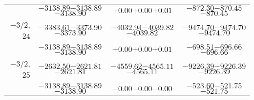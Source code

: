 \documentclass[compress]{beamer}
\begin{document}
\begin{frame}
{\begin{tabular}{r | c | c | c}
           & $-3138.89$\hspace{0.1 cm}$-3138.89$\hspace{0.1 cm}\textcolor{black}{$-3138.90$} & $+0.00$\hspace{0.1 cm}$+0.00$\hspace{0.1 cm}\textcolor{black}{$+0.01$} & $-872.30$\hspace{0.1 cm}$-870.45$\hspace{0.1 cm}\textcolor{black}{$-870.45$} \\
$-$3/2, 24 & $-3383.61$\hspace{0.1 cm}$-3373.90$\hspace{0.1 cm}\textcolor{black}{$-3373.90$} & $-4032.94$\hspace{0.1 cm}$-4039.82$\hspace{0.1 cm}\textcolor{black}{$-4039.82$} & $-9474.70$\hspace{0.1 cm}$-9474.70$\hspace{0.1 cm}\textcolor{black}{$-9474.70$} \\
           & $-3138.89$\hspace{0.1 cm}$-3138.89$\hspace{0.1 cm}\textcolor{black}{$-3138.90$} & $+0.00$\hspace{0.1 cm}$+0.00$\hspace{0.1 cm}\textcolor{black}{$+0.01$} & $-698.51$\hspace{0.1 cm}$-696.66$\hspace{0.1 cm}\textcolor{black}{$-696.66$} \\
$-$3/2, 25 & $-2632.50$\hspace{0.1 cm}$-2621.81$\hspace{0.1 cm}\textcolor{black}{$-2621.81$} & $-4559.62$\hspace{0.1 cm}$-4565.11$\hspace{0.1 cm}\textcolor{black}{$-4565.11$} & $-9226.39$\hspace{0.1 cm}$-9226.39$\hspace{0.1 cm}\textcolor{black}{$-9226.39$} \\
           & $-3138.89$\hspace{0.1 cm}$-3138.89$\hspace{0.1 cm}\textcolor{black}{$-3138.90$} & $-0.00$\hspace{0.1 cm}$-0.00$\hspace{0.1 cm}\textcolor{black}{$-0.00$} & $-523.60$\hspace{0.1 cm}$-521.75$\hspace{0.1 cm}\textcolor{black}{$-521.75$} \\

\end{tabular}}
\end{frame}
\end{document}
